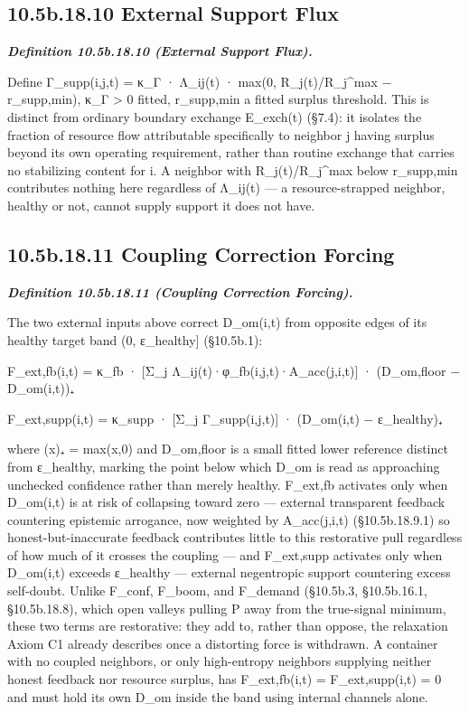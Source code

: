\documentclass[
]{article}
\begin{document}
\hypertarget{b.18.10-external-support-flux}{%
\subsection{10.5b.18.10 External Support
Flux}\label{b.18.10-external-support-flux}}

\emph{\textbf{Definition 10.5b.18.10 (External Support Flux).}}

Define Γ\_supp(i,j,t) = κ\_Γ · Λ\_ij(t) · max(0, R\_j(t)/R\_j\^{}max −
r\_supp,min), κ\_Γ \textgreater{} 0 fitted, r\_supp,min a fitted surplus
threshold. This is distinct from ordinary boundary exchange E\_exch(t)
(§7.4): it isolates the fraction of resource flow attributable
specifically to neighbor j having surplus beyond its own operating
requirement, rather than routine exchange that carries no stabilizing
content for i. A neighbor with R\_j(t)/R\_j\^{}max below r\_supp,min
contributes nothing here regardless of Λ\_ij(t) --- a resource-strapped
neighbor, healthy or not, cannot supply support it does not have.

\hypertarget{b.18.11-coupling-correction-forcing}{%
\subsection{10.5b.18.11 Coupling Correction
Forcing}\label{b.18.11-coupling-correction-forcing}}

\emph{\textbf{Definition 10.5b.18.11 (Coupling Correction Forcing).}}

The two external inputs above correct D\_om(i,t) from opposite edges of
its healthy target band (0, ε\_healthy{]} (§10.5b.1):

F\_ext,fb(i,t) = κ\_fb · {[}Σ\_j Λ\_ij(t)·φ\_fb(i,j,t)·A\_acc(j,i,t){]}
· (D\_om,floor − D\_om(i,t))₊

F\_ext,supp(i,t) = κ\_supp · {[}Σ\_j Γ\_supp(i,j,t){]} · (D\_om(i,t) −
ε\_healthy)₊

where (x)₊ = max(x,0) and D\_om,floor is a small fitted lower reference
distinct from ε\_healthy, marking the point below which D\_om is read as
approaching unchecked confidence rather than merely healthy. F\_ext,fb
activates only when D\_om(i,t) is at risk of collapsing toward zero ---
external transparent feedback countering epistemic arrogance, now
weighted by A\_acc(j,i,t) (§10.5b.18.9.1) so honest-but-inaccurate
feedback contributes little to this restorative pull regardless of how
much of it crosses the coupling --- and F\_ext,supp activates only when
D\_om(i,t) exceeds ε\_healthy --- external negentropic support
countering excess self-doubt. Unlike F\_conf, F\_boom, and F\_demand
(§10.5b.3, §10.5b.16.1, §10.5b.18.8), which open valleys pulling P away
from the true-signal minimum, these two terms are restorative: they add
to, rather than oppose, the relaxation Axiom C1 already describes once a
distorting force is withdrawn. A container with no coupled neighbors, or
only high-entropy neighbors supplying neither honest feedback nor
resource surplus, has F\_ext,fb(i,t) = F\_ext,supp(i,t) = 0 and must
hold its own D\_om inside the band using internal channels alone.
\end{document}
